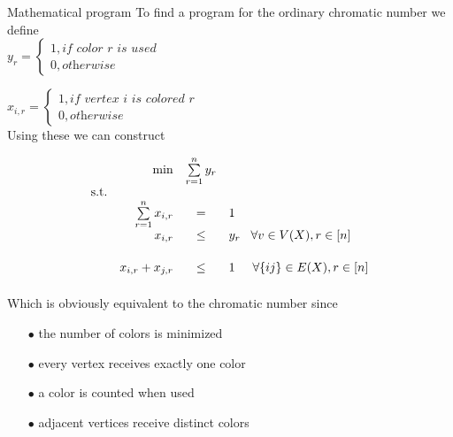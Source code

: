 \documentclass[13.5pt]{beamer}
\begin{document}
\begin{frame}{Mathematical program}
To find a program for the ordinary chromatic number we define\\ 
\vspace{0.5cm}	
$y_{r} = \begin{cases} 1, \textit{if color r is used} \\ 0, \textit{otherwise}\end{cases} $ 
\vspace{0.3cm}

$x_{i,r} = \begin{cases} 1, \textit{if vertex i is colored r} \\ 0, \textit{otherwise}\end{cases} $\\
\vspace{0.5cm}
Using these we can construct 
\end{frame}

\begin{frame}
\begin{equation} 
\begin{array}{lrcl} 
&\min&\sum\limits_{r=1}^n y_r\\ 
\mbox{s.t.}\\ 
& \sum\limits_{r=1}^n x_{i,r}& = & 1\\ 
\vspace{0.5cm}
& x_{i,r} & \le &y_{r} \hspace{0.3cm} \forall v \in V(X), r \in [n]\\
\vspace{0.3cm}
& x_{i,r}+x_{j,r} & \le & 1 \hspace{0.5cm} \forall \{ij\}\in E(X), r \in [n] \\
\end{array} 
\end{equation}
\vspace{0.4cm}
\pause 
Which is obviously equivalent to the chromatic number since
\begin{itemize}
\item[$\bullet$] the number of colors is minimized \pause
\item[$\bullet$] every vertex receives exactly one color \pause
\item[$\bullet$] a color is counted when used \pause
\item[$\bullet$] adjacent vertices receive distinct colors \pause 
\end{itemize}
\end{frame}
\end{document}
